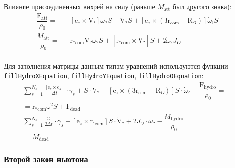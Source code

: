 \documentclass[a4paper,14pt]{extreport}
\newcommand{\br}[1]{\boldsymbol{\mathrm{#1}}}
\renewcommand{\vec}[1]{\br{#1}}
\newcommand{\com}{\text{com}}
\newcommand{\att}{\text{att}}
\begin{document}
Влияние присоединенных вихрей на силу (раньше $M_\att$ был другого знака):
\begin{equation}
\begin{split}
\dfrac{\vec F_\att}{\rho_0} =&
-[\vec e_z \times \vec V_?]\omega_? S
+ \dot{\vec{V}}_? S
+ [\vec e_z \times (3 \vec r_\com - \vec R_O)] \dot{\omega}_? S \\
\dfrac{M_\att}{\rho_0} =&
- \vec r_{*\com} \vec V_? \omega_? S
+ [\vec r_{*\com} \times \dot{\vec{V}}_?] S
+ 2 \dot{\omega}_? J_O \\
\end{split}
\end{equation}

Для заполнения матрицы данным типом уравнений используются функции
\texttt{fillHydroXEquation}, \texttt{fillHydroYEquation}, \texttt{fillHydroOEquation}:
\begin{equation}
\begin{split}
\sum\limits_{s=1}^{N_s} {\frac{[\vec e_z \times \vec c_s]}{\Delta t} \cdot \gamma_s}
+ S \cdot \dot{\vec{V}}_?
+ [\vec e_z \times (3 \vec r_\com - \vec R_O)] S \cdot \dot{\omega}_?
- \dfrac{\vec F_\text{hydro}}{\rho_0} =&\\
= %
\vec r_{*\com} \omega^2 S
+ \vec F_\text{dead}&\\
\sum\limits_{s=1}^{N_s} {\frac{\vec c_*^2}{2\Delta t} \cdot \gamma_s}
+ [\vec e_z \times \vec r_{*\com}] S \cdot \dot{\vec{V}}_?
+ 2 J_O \cdot \dot{\omega}_?
- \dfrac{M_\text{hydro}}{\rho_0} =&\\
= %
M_\text{dead}&
\end{split}
\end{equation}

\subsubsection{Второй закон ньютона}
\label{slau_newton}
\end{document}
